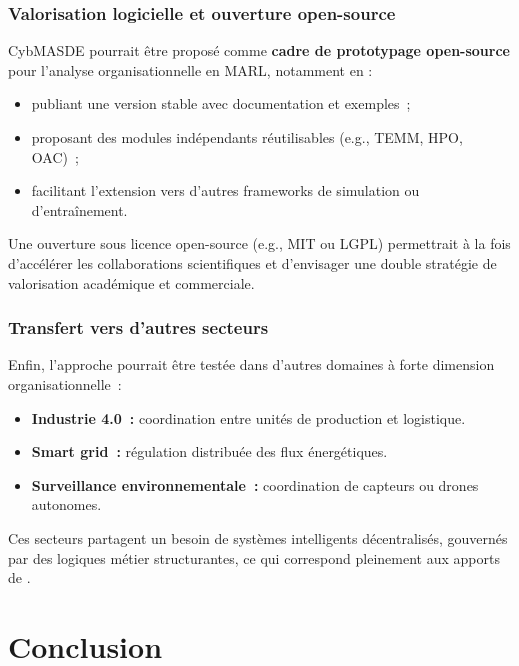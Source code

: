 \subsection*{Valorisation logicielle et ouverture open-source}

CybMASDE pourrait être proposé comme \textbf{cadre de prototypage open-source} pour l’analyse organisationnelle en MARL, notamment en :
\begin{itemize}
    \item publiant une version stable avec documentation et exemples~;
    \item proposant des modules indépendants réutilisables (e.g., TEMM, HPO, OAC)~;
    \item facilitant l’extension vers d’autres frameworks de simulation ou d’entraînement.
\end{itemize}

Une ouverture sous licence open-source (e.g., MIT ou LGPL) permettrait à la fois d’accélérer les collaborations scientifiques et d’envisager une double stratégie de valorisation académique et commerciale.

\subsection*{Transfert vers d'autres secteurs}

Enfin, l’approche pourrait être testée dans d'autres domaines à forte dimension organisationnelle~:
\begin{itemize}
    \item \textbf{Industrie 4.0~:} coordination entre unités de production et logistique.
    \item \textbf{Smart grid~:} régulation distribuée des flux énergétiques.
    \item \textbf{Surveillance environnementale~:} coordination de capteurs ou drones autonomes.
\end{itemize}

Ces secteurs partagent un besoin de systèmes intelligents décentralisés, gouvernés par des logiques métier structurantes, ce qui correspond pleinement aux apports de .


\clearpage
\thispagestyle{empty}
\null
\newpage

\chapter*{Conclusion}

